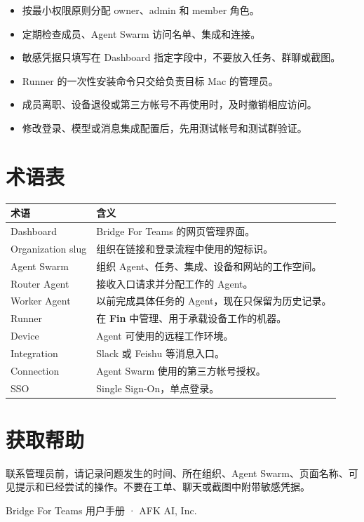 \documentclass[UTF8,a4paper,11pt]{ctexart}
\begin{document}
\begin{itemize}
  \item 按最小权限原则分配 owner、admin 和 member 角色。
  \item 定期检查成员、Agent Swarm 访问名单、集成和连接。
  \item 敏感凭据只填写在 Dashboard 指定字段中，不要放入任务、群聊或截图。
  \item Runner 的一次性安装命令只交给负责目标 Mac 的管理员。
  \item 成员离职、设备退役或第三方帐号不再使用时，及时撤销相应访问。
  \item 修改登录、模型或消息集成配置后，先用测试帐号和测试群验证。
\end{itemize}

\section{术语表}

\begin{longtable}{p{3.8cm}p{10cm}}
\toprule
术语 & 含义 \\
\midrule
Dashboard & Bridge For Teams 的网页管理界面。 \\
Organization slug & 组织在链接和登录流程中使用的短标识。 \\
Agent Swarm & 组织 Agent、任务、集成、设备和网站的工作空间。 \\
Router Agent & 接收入口请求并分配工作的 Agent。 \\
Worker Agent & 以前完成具体任务的 Agent，现在只保留为历史记录。 \\
Runner & 在 \textbf{Fin} 中管理、用于承载设备工作的机器。 \\
Device & Agent 可使用的远程工作环境。 \\
Integration & Slack 或 Feishu 等消息入口。 \\
Connection & Agent Swarm 使用的第三方帐号授权。 \\
SSO & Single Sign-On，单点登录。 \\
\bottomrule
\end{longtable}

\section{获取帮助}

联系管理员前，请记录问题发生的时间、所在组织、Agent Swarm、页面名称、可见提示和已经尝试的操作。不要在工单、聊天或截图中附带敏感凭据。

\vfill
\begin{center}
\textcolor{BridgeGray}{Bridge For Teams 用户手册 · AFK AI, Inc.}
\end{center}
\end{document}

